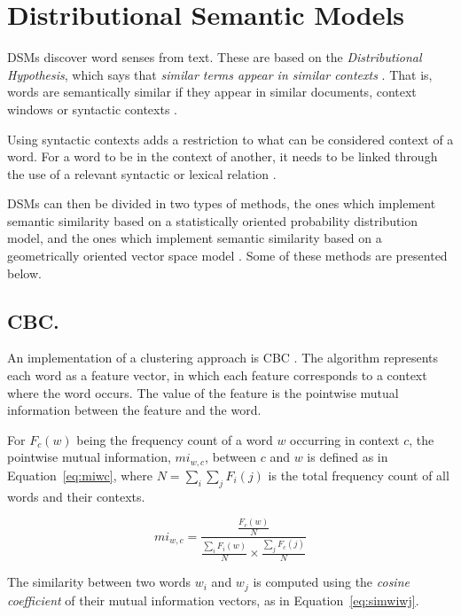 \section{Distributional Semantic Models}

\acp{DSM} discover word senses from text. These are based on the
\textit{Distributional Hypothesis}, which says that \textit{similar terms
appear in similar contexts} \cite{curran2004distributional}. That is, words are
semantically similar if they appear in similar documents, context windows or
syntactic contexts \cite{van2010mining}.

Using syntactic contexts adds a restriction to what can be considered context of
a word. For a word to be in the context of another, it needs to be linked
through the use of a relevant syntactic or lexical relation
\cite{baroni2010distributional}.

\acp{DSM} can then be divided in two types of methods, the ones which implement
semantic similarity based on a statistically oriented probability distribution
model, and the ones which implement semantic similarity based on a geometrically
oriented vector space model \cite{van2010mining}. Some of these methods are
presented below.

\subsection{CBC.}

An implementation of a clustering approach is \ac{CBC}
\cite{pantel2003clustering,pantel2002discovering}. The algorithm represents each
word as a feature vector, in which each feature corresponds to a context where
the word occurs. The value of the feature is the pointwise mutual information
between the feature and the word.

For $F_c(w)$ being the frequency count of a word $w$ occurring in context $c$,
the pointwise mutual information, $mi_{w,c}$, between $c$ and $w$ is defined as
in Equation~\ref{eq:miwc}, where $N = \sum_i\sum_jF_i(j)$ is the total
frequency count of all words and their contexts.

\begin{equation}
 mi_{w,c} = \frac{\frac{F_c(w)}{N}}
                 {\frac{\sum_iF_i(w)}{N} \times
                  \frac{\sum_jF_c(j)}{N}}
 \label{eq:miwc}
\end{equation}

The similarity between two words $w_i$ and $w_j$ is computed using the
\textit{cosine coefficient} of their mutual information vectors, as in
Equation~\ref{eq:simwiwj}.

